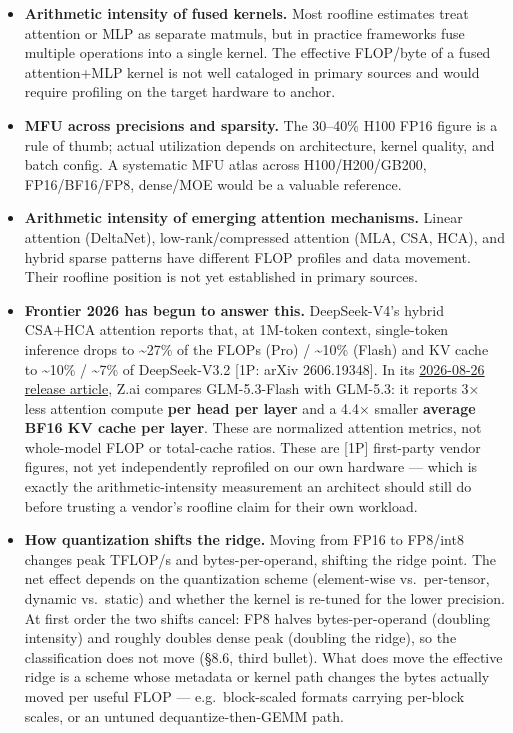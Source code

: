 \label{what-we-still-dont-know}


\begin{itemize}
\item
  \textbf{Arithmetic intensity of fused kernels.} Most roofline
  estimates treat attention or MLP as separate matmuls, but in practice
  frameworks fuse multiple operations into a single kernel. The
  effective FLOP/byte of a fused attention+MLP kernel is not well
  cataloged in primary sources and would require profiling on the target
  hardware to anchor.
\item
  \textbf{MFU across precisions and sparsity.} The 30--40\% H100 FP16
  figure is a rule of thumb; actual utilization depends on architecture,
  kernel quality, and batch config. A systematic MFU atlas across
  H100/H200/GB200, FP16/BF16/FP8, dense/MOE would be a valuable
  reference.
\item
  \textbf{Arithmetic intensity of emerging attention mechanisms.} Linear
  attention (DeltaNet), low-rank/compressed attention (MLA, CSA, HCA),
  and hybrid sparse patterns have different FLOP profiles and data
  movement. Their roofline position is not yet established in primary
  sources.
\item
  \textbf{Frontier 2026 has begun to answer this.} DeepSeek-V4's hybrid
  CSA+HCA attention reports that, at 1M-token context, single-token
  inference drops to \textasciitilde27\% of the FLOPs (Pro) /
  \textasciitilde10\% (Flash) and KV cache to \textasciitilde10\% /
  \textasciitilde7\% of DeepSeek-V3.2 {[}1P: arXiv 2606.19348{]}. In its
  \href{https://z.ai/blog/glm-5.3-flash}{2026-08-26 release article},
  Z.ai compares GLM-5.3-Flash with GLM-5.3: it reports 3× less attention
  compute \textbf{per head per layer} and a 4.4× smaller \textbf{average
  BF16 KV cache per layer}. These are normalized attention metrics, not
  whole-model FLOP or total-cache ratios. These are \mbox{{[}1P{]}} first-party
  vendor figures, not yet independently reprofiled on our own hardware
  --- which is exactly the arithmetic-intensity measurement an architect
  should still do before trusting a vendor's roofline claim for their
  own workload.
\item
  \textbf{How quantization shifts the ridge.} Moving from FP16 to
  FP8/int8 changes peak TFLOP/s and bytes-per-operand, shifting the
  ridge point. The net effect depends on the quantization scheme
  (element-wise vs.~per-tensor, dynamic vs.~static) and whether the
  kernel is re-tuned for the lower precision. At first order the two
  shifts cancel: FP8 halves bytes-per-operand (doubling intensity) and
  roughly doubles dense peak (doubling the ridge), so the classification
  does not move (§8.6, third bullet). What does move the effective ridge
  is a scheme whose metadata or kernel path changes the bytes actually
  moved per useful FLOP --- e.g.~block-scaled formats carrying per-block
  scales, or an untuned dequantize-then-GEMM path.
\end{itemize}

